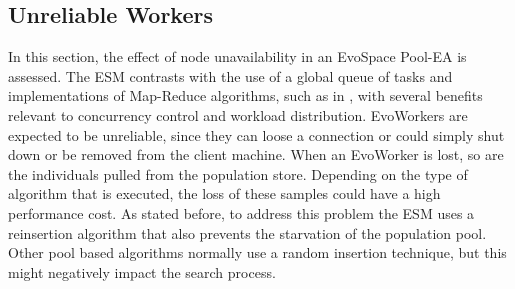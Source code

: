 \subsection{Unreliable Workers}
In this section, the effect of node unavailability in an EvoSpace Pool-EA is assessed.
The ESM contrasts with the use of a global queue of tasks and implementations
of Map-Reduce algorithms, such as in \cite{fazenda2012}, with several benefits relevant to
concurrency control and workload distribution. 
EvoWorkers are expected to be unreliable, since they can loose a connection or could simply shut down or be removed from the client machine.
When an EvoWorker is lost, so are the individuals pulled from the population store.
Depending on the type of algorithm that is executed, the loss of these samples could have a high performance cost.
As stated before, to address this problem the ESM uses a reinsertion algorithm that also prevents
the starvation of the population pool. Other pool based algorithms normally use
a random insertion technique, but this might negatively impact the search process.

